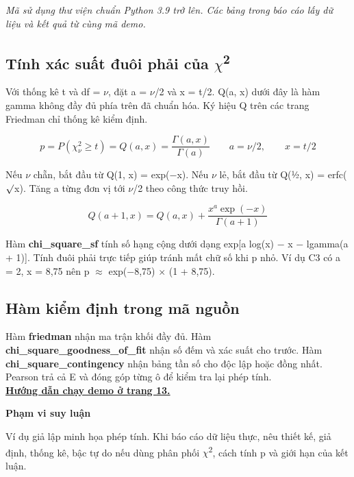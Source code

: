 \documentclass[11pt,a4paper]{article}
\newcommand{\ReportLead}[1]{{\large\itshape #1\par}\medskip}
\newcommand{\ResultBox}[2]{%
  \medskip\noindent
  \colorbox{wash}{\parbox{\dimexpr\linewidth-2\fboxsep\relax}{%
    \textbf{\textcolor{accent}{#1}}\par #2}}%
  \par\medskip
}
\begin{document}
\ReportLead{Mã sử dụng thư viện chuẩn Python 3.9 trở lên. Các bảng trong báo cáo lấy dữ liệu và kết quả từ cùng mã demo.}

\subsection*{Tính xác suất đuôi phải của \ensuremath{\chi}\textsuperscript{2}}

Với thống kê t và df = \ensuremath{\nu}, đặt a = \ensuremath{\nu}/2 và x = t/2. Q(a, x) dưới đây là hàm
gamma không đầy đủ phía trên đã chuẩn hóa. Ký hiệu Q trên các trang Friedman chỉ thống kê kiểm
định.~\cite{ref-13}

\begin{equation}
  p = P(\chi ^{2}_{\nu } \geq  t) = Q(a, x) = \frac{\Gamma (a, x)}{\Gamma (a)}\qquad a = \nu /2,\qquad x = t/2\label{eq:9}
\end{equation}

Nếu \ensuremath{\nu} chẵn, bắt đầu từ Q(1, x) = exp(\ensuremath{-}x). Nếu \ensuremath{\nu} lẻ, bắt đầu từ
Q(½, x) = erfc(\ensuremath{\surd}x). Tăng a từng đơn vị tới \ensuremath{\nu}/2 theo công thức truy
hồi.~\cite{ref-13}

\begin{equation}
  Q(a + 1, x) = Q(a, x) + \frac{x^{a} \exp(-x)}{\Gamma (a + 1)}\label{eq:10}
\end{equation}

Hàm \textbf{chi\_square\_sf} tính số hạng cộng dưới dạng exp[a log(x) \ensuremath{-} x \ensuremath{-}
lgamma(a + 1)]. Tính đuôi phải trực tiếp giúp tránh mất chữ số khi p nhỏ. Ví dụ C3 có a = 2, x = 8,75 nên
p \ensuremath{\approx} exp(\ensuremath{-}8,75) \ensuremath{\times} (1 + 8,75).

\subsection*{Hàm kiểm định trong mã nguồn}

Hàm \textbf{friedman} nhận ma trận khối đầy đủ. Hàm \textbf{chi\_square\_goodness\_of\_fit} nhận số đếm
và xác suất cho trước. Hàm \textbf{chi\_square\_contingency} nhận bảng tần số cho độc lập hoặc đồng nhất.
Pearson trả cả E và đóng góp từng ô để kiểm tra lại phép tính.\\\hyperref[sec:demo-guide]{\textbf{Hướng
dẫn chạy demo ở trang 13.}}

\ResultBox{Phạm vi suy luận}{Ví dụ giả lập minh họa phép tính. Khi báo cáo dữ liệu thực, nêu thiết kế, giả định, thống kê, bậc tự do nếu dùng phân phối \ensuremath{\chi}\textsuperscript{2}, cách tính p và giới hạn của kết luận.}
\end{document}
